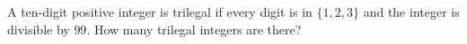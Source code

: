 A ten-digit positive integer is trilegal if every digit is in $\{1,2,3\}$ and the integer is divisible by $99$. How many trilegal integers are there?
